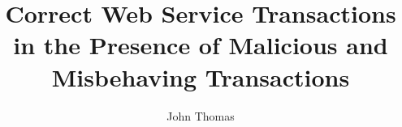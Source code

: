 \documentclass{styles/uscthesis}
\title{Correct Web Service Transactions in the Presence of Malicious and Misbehaving Transactions}
\author{John Thomas}{Ravan III}    %
\theoremstyle{definition}
\theoremstyle{plain}
\begin{document}
                          


\printbibliography %

\Appendix                 %
	
\end{document}
